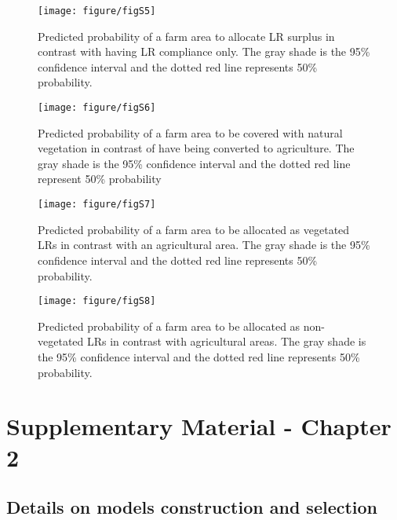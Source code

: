 \documentclass[
	12pt,				%
	oneside,			%
	a4paper,			%
	chapter=TITLE,		%
	section=TITLE,		%
	brazil,			%
	english				%
	]{abntex2}
\begin{document}
\begin{figure}[H]

{\centering \texttt{[image: figure/figS5]} 

}

\caption{Predicted probability of a farm area to allocate LR surplus in contrast with having LR compliance only. The gray shade is the 95\% confidence interval and the dotted red line represents 50\% probability. }\label{fig:figureS5}
\end{figure}
\begin{figure}[H]

{\centering \texttt{[image: figure/figS6]} 

}

\caption{Predicted probability of a farm area to be covered with natural vegetation in contrast of have being converted to agriculture. The gray shade is the 95\% confidence interval and the dotted red line represent 50\% probability }\label{fig:figureS6}
\end{figure}
\begin{figure}[H]

{\centering \texttt{[image: figure/figS7]} 

}

\caption{Predicted probability of a farm area to be allocated as vegetated LRs in contrast with an agricultural area. The gray shade is the 95\% confidence interval and the dotted red line represents 50\% probability.}\label{fig:figureS7}
\end{figure}
\begin{figure}[H]

{\centering \texttt{[image: figure/figS8]} 

}

\caption{Predicted probability of a farm area to be allocated as non-vegetated LRs in contrast with agricultural areas. The gray shade is the 95\% confidence interval and the dotted red line represents 50\% probability.}\label{fig:figureS8}
\end{figure}
\hypertarget{appendix-b}{%
\chapter{Supplementary Material - Chapter 2}\label{appendix-b}}

\hypertarget{details-on-models-construction-and-selection}{%
\section{Details on models construction and selection}\label{details-on-models-construction-and-selection}}
\end{document}
